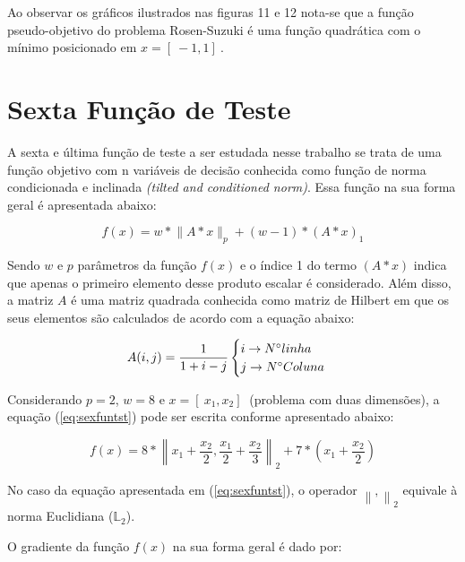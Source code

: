 Ao observar os gráficos ilustrados nas figuras 11 e 12 nota-se que a função pseudo-objetivo do problema Rosen-Suzuki é uma função quadrática com o mínimo posicionado em $x=[\ -1 , 1 ]\ $.

\section{Sexta Função de Teste}\label{sec:sexfun}

A sexta e última função de teste a ser estudada nesse trabalho se trata de uma função objetivo com n variáveis de decisão conhecida como função de  norma condicionada e inclinada \textit{(tilted and conditioned norm)}. Essa função na sua forma geral é apresentada abaixo:

\begin{equation}\label{eq:sexfuntst}
  f(x)= w*\lVert A*x \rVert_p+(w-1)*(A*x)_1
\end{equation}

Sendo $w$ e $p$ parâmetros da função $f(x)$ e o índice 1 do termo $(A*x)$ indica que apenas o primeiro elemento desse produto escalar é considerado. Além disso, a matriz $A$ é uma matriz quadrada conhecida como matriz de Hilbert em que os seus elementos são calculados de acordo com a equação abaixo:

\begin{equation}\label{eq:auxsexfuntst}
  A(i,j)= \frac{1}{1+i-j} \begin{cases}
        i \rightarrow N\degree linha\\
        j \rightarrow N\degree Coluna
    \end{cases}
\end{equation}

Considerando $p=2$, $w=8$ e $x=[\ x_1 , x_2 ]\ $ (problema com duas dimensões), a equação (\ref{eq:sexfuntst}) pode ser escrita conforme apresentado abaixo:

\newcommand\norm[1]{\left\lVert#1\right\rVert}

\begin{equation}\label{eq:sexfuntst}
  f(x)= 8*\norm{ x_1 + \frac{x_2}{2},\frac{x_1}{2}+\frac{x_2}{3} }_2+7*(x_1+\frac{x_2}{2}) 
\end{equation}

No caso da equação apresentada em (\ref{eq:sexfuntst}), o operador $\norm{,}_2$  equivale à norma Euclidiana ($\mathbb{L}_2$). \par
O gradiente da função $f(x)$ na sua forma geral é dado por:

